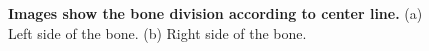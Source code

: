 \begin{figure}[!ht]
    \centering
    \begin{subfigure}[b]{.45\linewidth}
        \caption{}\label{left-side}
    \end{subfigure}
    \hspace{1em}
    \begin{subfigure}[b]{.45\linewidth}
        \caption{}\label{right-side}
    \end{subfigure}
     \caption{\textbf{Images show the bone division according to center line.} (a) Left side of the bone. (b) Right side of the bone.}
    \label{left-right-side}
\end{figure}

